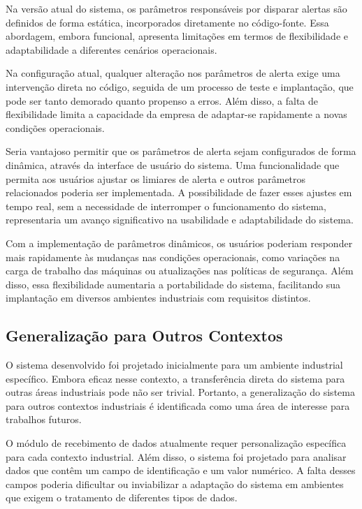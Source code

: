 Na versão atual do sistema, os parâmetros responsáveis por disparar alertas são definidos de forma estática, incorporados diretamente no código-fonte. Essa abordagem, embora funcional, apresenta limitações em termos de flexibilidade e adaptabilidade a diferentes cenários operacionais.

Na configuração atual, qualquer alteração nos parâmetros de alerta exige uma intervenção direta no código, seguida de um processo de teste e implantação, que pode ser tanto demorado quanto propenso a erros. Além disso, a falta de flexibilidade limita a capacidade da empresa de adaptar-se rapidamente a novas condições operacionais.

Seria vantajoso permitir que os parâmetros de alerta sejam configurados de forma dinâmica, através da interface de usuário do sistema. Uma funcionalidade que permita aos usuários ajustar os limiares de alerta e outros parâmetros relacionados poderia ser implementada. A possibilidade de fazer esses ajustes em tempo real, sem a necessidade de interromper o funcionamento do sistema, representaria um avanço significativo na usabilidade e adaptabilidade do sistema.

Com a implementação de parâmetros dinâmicos, os usuários poderiam responder mais rapidamente às mudanças nas condições operacionais, como variações na carga de trabalho das máquinas ou atualizações nas políticas de segurança. Além disso, essa flexibilidade aumentaria a portabilidade do sistema, facilitando sua implantação em diversos ambientes industriais com requisitos distintos.

\subsection{Generalização para Outros Contextos}

O sistema desenvolvido foi projetado inicialmente para um ambiente industrial específico. Embora eficaz nesse contexto, a transferência direta do sistema para outras áreas industriais pode não ser trivial. Portanto, a generalização do sistema para outros contextos industriais é identificada como uma área de interesse para trabalhos futuros.

O módulo de recebimento de dados atualmente requer personalização específica para cada contexto industrial. Além disso, o sistema foi projetado para analisar dados que contêm um campo de identificação e um valor numérico. A falta desses campos poderia dificultar ou inviabilizar a adaptação do sistema em ambientes que exigem o tratamento de diferentes tipos de dados.

